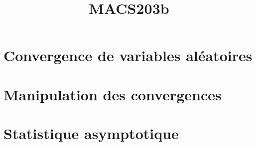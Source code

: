 \documentclass[a4paper,9pt]{article}
\title{\vspace{-1.2cm} \textbf{MACS203b}}
\begin{document}
\maketitle

\vspace{-1.5cm}

\section{Convergence de variables aléatoires}

	

\section{Manipulation des convergences}

	

\section{Statistique asymptotique}

	
\end{document}
